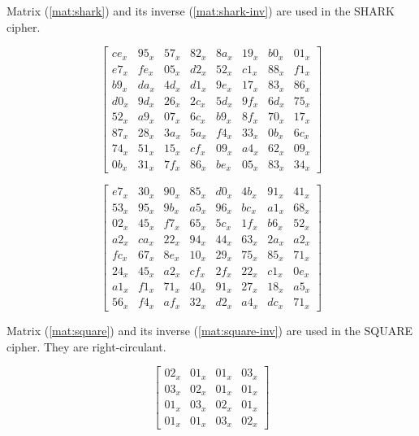 Matrix (\ref{mat:shark}) and its inverse (\ref{mat:shark-inv}) are used in the SHARK \cite{SHARK1996} cipher.

\begin{equation}\label{mat:shark}
\begin{bmatrix}
ce_x & 95_x & 57_x & 82_x & 8a_x & 19_x & b0_x & 01_x\\
e7_x & fe_x & 05_x & d2_x & 52_x & c1_x & 88_x & f1_x\\
b9_x & da_x & 4d_x & d1_x & 9e_x & 17_x & 83_x & 86_x\\
d0_x & 9d_x & 26_x & 2c_x & 5d_x & 9f_x & 6d_x & 75_x\\
52_x & a9_x & 07_x & 6c_x & b9_x & 8f_x & 70_x & 17_x\\
87_x & 28_x & 3a_x & 5a_x & f4_x & 33_x & 0b_x & 6c_x\\
74_x & 51_x & 15_x & cf_x & 09_x & a4_x & 62_x & 09_x\\
0b_x & 31_x & 7f_x & 86_x & be_x & 05_x & 83_x & 34_x
\end{bmatrix}
\end{equation}

\begin{equation}\label{mat:shark-inv}
\begin{bmatrix}
e7_x &30_x &90_x &85_x &d0_x &4b_x &91_x &41_x\\
53_x &95_x &9b_x &a5_x &96_x &bc_x &a1_x &68_x\\
02_x &45_x &f7_x &65_x &5c_x &1f_x &b6_x &52_x\\
a2_x &ca_x &22_x &94_x &44_x &63_x &2a_x &a2_x\\
fc_x &67_x &8e_x &10_x &29_x &75_x &85_x &71_x\\
24_x &45_x &a2_x &cf_x &2f_x &22_x &c1_x &0e_x\\
a1_x &f1_x &71_x &40_x &91_x &27_x &18_x &a5_x\\
56_x &f4_x &af_x &32_x &d2_x &a4_x &dc_x &71_x
\end{bmatrix}
\end{equation}

Matrix (\ref{mat:square}) and its inverse (\ref{mat:square-inv}) are used in the SQUARE \cite{SQUARE1997} cipher. They are right-circulant.

\begin{equation}\label{mat:square}
\begin{bmatrix}
02_x & 01_x & 01_x & 03_x\\
03_x & 02_x & 01_x & 01_x\\
01_x & 03_x & 02_x & 01_x\\
01_x & 01_x & 03_x & 02_x
\end{bmatrix}
\end{equation}

